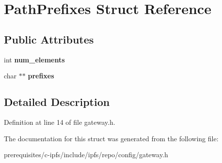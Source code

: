 \hypertarget{struct_path_prefixes}{}\section{Path\+Prefixes Struct Reference}
\label{struct_path_prefixes}
\subsection*{Public Attributes}
\begin{DoxyCompactItemize}
\item 
\mbox{\label{struct_path_prefixes_ad1c3d349962ffbf5171c1fdf9e026117}} 
int {\bfseries num\+\_\+elements}
\item 
\mbox{\label{struct_path_prefixes_a69a597bab1296c1802ff13706d274f02}} 
char $\ast$$\ast$ {\bfseries prefixes}
\end{DoxyCompactItemize}


\subsection{Detailed Description}


Definition at line 14 of file gateway.\+h.



The documentation for this struct was generated from the following file\+:\begin{DoxyCompactItemize}
\item 
prerequisites/c-\/ipfs/include/ipfs/repo/config/gateway.\+h\end{DoxyCompactItemize}

